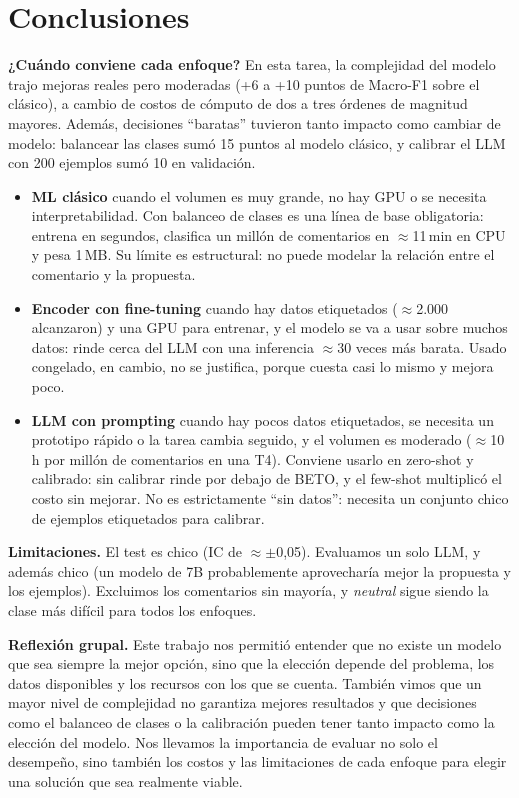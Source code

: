 \documentclass[10pt,a4paper]{article}
\begin{document}
\section{Conclusiones}

\textbf{¿Cuándo conviene cada enfoque?} En esta tarea, la complejidad del modelo trajo mejoras reales pero moderadas (+6 a +10 puntos de Macro-F1 sobre el clásico), a cambio de costos de cómputo de dos a tres órdenes de magnitud mayores. Además, decisiones ``baratas'' tuvieron tanto impacto como cambiar de modelo: balancear las clases sumó 15 puntos al modelo clásico, y calibrar el LLM con 200 ejemplos sumó 10 en validación.
\begin{itemize}
  \item \textbf{ML clásico} cuando el volumen es muy grande, no hay GPU o se necesita interpretabilidad. Con balanceo de clases es una línea de base obligatoria: entrena en segundos, clasifica un millón de comentarios en $\approx$11\,min en CPU y pesa 1\,MB. Su límite es estructural: no puede modelar la relación entre el comentario y la propuesta.
  \item \textbf{Encoder con fine-tuning} cuando hay datos etiquetados ($\approx$2.000 alcanzaron) y una GPU para entrenar, y el modelo se va a usar sobre muchos datos: rinde cerca del LLM con una inferencia $\approx$30 veces más barata. Usado congelado, en cambio, no se justifica, porque cuesta casi lo mismo y mejora poco.
  \item \textbf{LLM con prompting} cuando hay pocos datos etiquetados, se necesita un prototipo rápido o la tarea cambia seguido, y el volumen es moderado ($\approx$10\,h por millón de comentarios en una T4). Conviene usarlo en zero-shot y calibrado: sin calibrar rinde por debajo de BETO, y el few-shot multiplicó el costo sin mejorar. No es estrictamente ``sin datos'': necesita un conjunto chico de ejemplos etiquetados para calibrar.
\end{itemize}

\textbf{Limitaciones.} El test es chico (IC de $\approx\pm$0,05). Evaluamos un solo LLM, y además chico (un modelo de 7B probablemente aprovecharía mejor la propuesta y los ejemplos). Excluimos los comentarios sin mayoría, y \emph{neutral} sigue siendo la clase más difícil para todos los enfoques.

\textbf{Reflexión grupal.} Este trabajo nos permitió entender que no existe un modelo que sea siempre la mejor opción, sino que la elección depende del problema, los datos disponibles y los recursos con los que se cuenta. También vimos que un mayor nivel de complejidad no garantiza mejores resultados y que decisiones como el balanceo de clases o la calibración pueden tener tanto impacto como la elección del modelo. Nos llevamos la importancia de evaluar no solo el desempeño, sino también los costos y las limitaciones de cada enfoque para elegir una solución que sea realmente viable.
\end{document}
